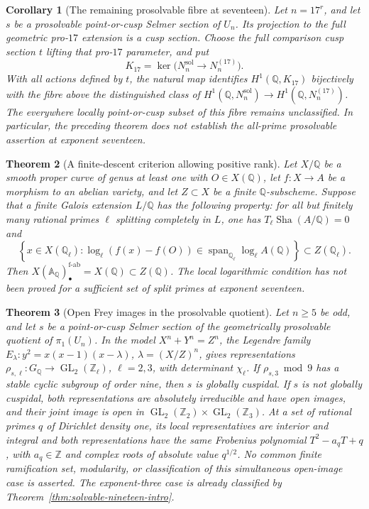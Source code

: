 \documentclass[11pt]{article}
\newcommand{\Q}{\mathbb Q}
\newcommand{\Z}{\mathbb Z}
\newcommand{\A}{\mathbb A}
\newcommand{\Sha}{\operatorname{Sha}}
\newtheorem{theorem}{Theorem}[section]
\newtheorem{corollary}[theorem]{Corollary}
\theoremstyle{definition}
\begin{document}
\begin{corollary}[The remaining prosolvable fibre at seventeen]
\label{cor:proseventeen-fibre-intro}
Let $n=17^r$, and let $s$ be a prosolvable point-or-cusp Selmer
section of $U_n$. Its projection to the full geometric pro-$17$
extension is a cusp section. Choose the full comparison cusp section
$t$ lifting that pro-$17$ parameter, and put
\[
 K_{17}=\ker\bigl(N_n^{\mathrm{sol}}\longrightarrow N_n^{(17)}\bigr).
\]
With all actions defined by $t$, the natural map identifies
$H^1(\Q,K_{17})$ bijectively with the fibre above the distinguished
class of $H^1(\Q,N_n^{\mathrm{sol}})\to H^1(\Q,N_n^{(17)})$.
The everywhere locally point-or-cusp subset of this fibre remains
unclassified. In particular, the preceding theorem does not establish
the all-prime prosolvable assertion at exponent seventeen.
\end{corollary}

\begin{theorem}[A finite-descent criterion allowing positive rank]
\label{thm:positive-rank-split-intro}
Let $X/\Q$ be a smooth proper curve of genus at least one with
$O\in X(\Q)$, let $f:X\to A$ be a morphism to an abelian variety,
and let $Z\subset X$ be a finite $\Q$-subscheme. Suppose that a
finite Galois extension $L/\Q$ has the following property: for all
but finitely many rational primes $\ell$ splitting completely in
$L$, one has $T_\ell\Sha(A/\Q)=0$ and
\[
 \left\{x\in X(\Q_\ell):
 \log_\ell(f(x)-f(O))\in
 \operatorname{span}_{\Q_\ell}\log_\ell A(\Q)\right\}
       \subset Z(\Q_\ell).
\]
Then $X(\A_\Q)_\bullet^{\mathrm{f\text{-}ab}}=X(\Q)\subset Z(\Q)$.
The local logarithmic condition has not been proved for a
sufficient set of split primes at exponent seventeen.
\end{theorem}


\begin{theorem}[Open Frey images in the prosolvable quotient]
\label{thm:prosolvable-frey-open-intro}
Let $n\ge5$ be odd, and let $s$ be a point-or-cusp Selmer section
of the geometrically prosolvable quotient of $\pi_1(U_n)$.
In the model $X^n+Y^n=Z^n$, the Legendre family
$E_\lambda:y^2=x(x-1)(x-\lambda)$, $\lambda=(X/Z)^n$,
gives representations
$\rho_{s,\ell}:G_\Q\to\operatorname{GL}_2(\Z_\ell)$,
$\ell=2,3$, with determinant $\chi_\ell$.
If $\rho_{s,3}\bmod9$ has a stable cyclic subgroup of order nine,
then $s$ is globally cuspidal.
If $s$ is not globally cuspidal, both representations are absolutely
irreducible and have open images, and their joint image is open in
$\operatorname{GL}_2(\Z_2)\times\operatorname{GL}_2(\Z_3)$.
At a set of rational primes $q$ of Dirichlet density one, its local
representatives are interior and integral and both representations
have the same Frobenius polynomial $T^2-a_qT+q$, with $a_q\in\Z$
and complex roots of absolute value $q^{1/2}$.
No common finite ramification set, modularity, or classification of
this simultaneous open-image case is asserted. The exponent-three
case is already classified by Theorem~\ref{thm:solvable-nineteen-intro}.
\end{theorem}
\end{document}
